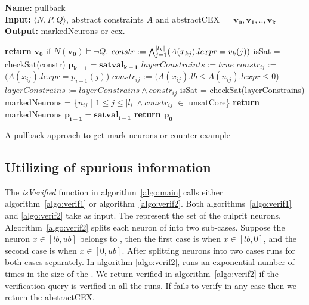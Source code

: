 \begin{algorithm}[t]
    \textbf{Name: } pullback \\
    \textbf{Input: } $\langle N,P,Q \rangle$, abstract constraints $A$ and abstractCEX $=\boldsymbol{v_0}, \boldsymbol{v_1}, .., \boldsymbol{v_k}$ \\
    \textbf{Output: } markedNeurons or cex. 
    \begin{algorithmic}[1]
     \State \textbf{return} $\boldsymbol{v_0}$ if $N(\boldsymbol{v_0}) \models \neg Q$. 
     \State $constr := \bigwedge_{j=1}^{|l_k|} (A(x_{kj}).lexpr = v_k(j))$
     \State isSat = checkSat(constr)
      
        \State $\boldsymbol{p_{k-1}} = \boldsymbol{satval_{k-1}}$ 
     \EndIf
          \State $layerConstraints := true$
              \State $constr_{ij}$ := $(A(x_{ij}).lexpr = p_{i+1}(j)$) 
            \Else
              \State $constr_{ij}$ := $(A(x_{ij}).lb \leq A(n_{ij}).lexpr \leq 0$)
            \EndIf
            \State $layerConstrains := layerConstrains \land constr_{ij}$
          \EndFor
          \State isSat = checkSat(layerConstrains)
            \State markedNeurons = \{$n_{ij}$ | $1 \leq j\leq |l_i| \land constr_{ij}$ $\in$ unsatCore\}
            \State \textbf{return } markedNeurons
          \Else
            \State $\boldsymbol{p_{i-1}} = \boldsymbol{satval_{i-1}}$
          \EndIf
        \EndIf
     \EndFor
      \State \textbf{return} $\boldsymbol{p_0}$ 
    \end{algorithmic}
    \caption{A pullback approach to get mark neurons or counter example}
    \label{algo:refine1}
  \end{algorithm}



\subsection{Utilizing of spurious information}
The \emph{isVerified} function in algorithm~\ref{algo:main} calls either algorithm~\ref{algo:verif1} or algorithm~\ref{algo:verif2}. 
Both algorithms~\ref{algo:verif1} and \ref{algo:verif2} take \markednewrons{} as input. 
The \markednewrons{} represent the set of the culprit neurons. 
Algorithm~\ref{algo:verif2} splits each neuron of \markednewrons{} into two sub-cases. Suppose the 
neuron $x\in [lb,ub]$ belongs to \markednewrons{}, then the first case is when $x \in [lb,0]$, and the second case is when $x \in [0,ub]$.   
After splitting neurons into two cases \deeppoly{} runs for both cases separately. In algorithm \ref{algo:verif2}, \deeppoly{}
runs an exponential number of times in the size of the \markednewrons{}. We return verified in algorithm~\ref{algo:verif2} if 
the verification query is verified in all the \deeppoly{} runs. If \deeppoly{} fails to verify in any case then we return the abstractCEX. 

